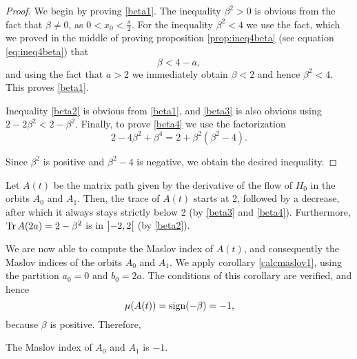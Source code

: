 \begin{proof}
We begin by proving \eqref{beta1}. The inequality $\beta^2 > 0$ is obvious from the fact that $\beta \neq 0$, as $0 < x_0 < \frac\pi2$. For the inequality $\beta^2 < 4$ we use the fact, which we proved in the middle of proving proposition \ref{prop:ineq4beta} (see equation \eqref{eq:ineq4beta}) that
\begin{equation}
\beta < 4 - a,
\end{equation}
and using the fact that $a > 2$ we immediately obtain $\beta < 2$ and hence $\beta^2 < 4$. This proves \eqref{beta1}.

Inequality \eqref{beta2} is obvious from \eqref{beta1}, and \eqref{beta3} is also obvious using $2 - 2 \beta^2 < 2 - \beta^2$. Finally, to prove \eqref{beta4} we use the factorization
\begin{equation}
2 - 4 \beta^2 + \beta^4 = 2 + \beta^2 (\beta^2 - 4).
\end{equation}

Since $\beta^2$ is positive and $\beta^2 - 4$ is negative, we obtain the desired inequality.
\end{proof}

\begin{corollary}
Let $A(t)$ be the matrix path given by the derivative of the flow of $H_0$ in the orbits $A_0$ and $A_1$. Then, the trace of $A(t)$ starts at 2, followed by a decrease, after which it always stays strictly below 2 (by \eqref{beta3} and \eqref{beta4}). Furthermore, $\operatorname{Tr} A(2a) = 2 - \beta^2$ is in $\ointerval{-2}2$ (by \eqref{beta2}).
\end{corollary}

We are now able to compute the Maslov index of $A(t)$, and consequently the Maslov indices of the orbits $A_0$ and $A_1$. We apply corollary \ref{calcmaslov1}, using the partition $a_0 = 0$ and $b_0 = 2a$. The conditions of this corollary are verified, and hence
\begin{equation}
\mu(A(t)) = \operatorname{sign}(-\beta) = -1,
\end{equation}
because $\beta$ is positive. Therefore,

\begin{prop}
The Maslov index of $A_0$ and $A_1$ is $-1$.
\end{prop}

